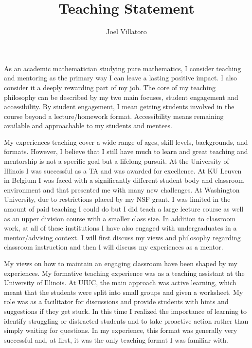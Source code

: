\documentclass{article}
\title{Teaching Statement}
\author{Joel Villatoro}
\date{}
\begin{document}
\vspace{-0.5in}
\maketitle

As an academic mathematician studying pure mathematics, I consider teaching and mentoring as the primary way I can leave a lasting positive impact. 
I also consider it a deeply rewarding part of my job.
The core of my teaching philosophy can be described by my two main focuses, student engagement and accessibility. 
By student engagement, I mean getting students involved in the course beyond a lecture/homework format. Accessibility means remaining available and approachable to my students and mentees.

My experiences teaching cover a wide range of ages, skill levels, backgrounds, and formats. However, I believe that I still have much to learn and great teaching and mentorship is not a specific goal but a lifelong pursuit. At the University of Illinois I was successful as a TA and was awarded for excellence. At KU Leuven in Belgium I was faced with a significantly different student body and classroom environment and that presented me with many new challenges. At Washington University, due to restrictions placed by my NSF grant, I was limited in the amount of paid teaching I could do but I did teach a large lecture course as well as an upper division course with a smaller class size. In addition to classroom work, at all of these institutions I have also engaged with undergraduates in a mentor/advising context. I will first discuss my views and philosophy regarding classroom instruction and then I will discuss my experiences as a mentor.

My views on how to maintain an engaging classroom have been shaped by my experiences. My formative teaching experience was as a teaching assistant at the University of Illinois. At UIUC, the main approach was active learning, which meant that the students were split into small groups and given a worksheet. My role was as a facilitator for discussions and provide students with hints and suggestions if they get stuck. In this time I realized the importance of learning to identify struggling or distracted students and to take proactive action rather than simply waiting for questions. In my experience, this format was generally very successful and, at first, it was the only teaching format I was familiar with.
\end{document}
